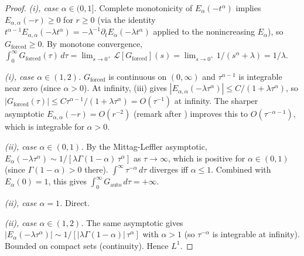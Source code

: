 \documentclass[11pt]{article}
\theoremstyle{definition}
\theoremstyle{remark}
\begin{document}
\begin{proof}
\emph{(i), case $\alpha \in (0, 1]$.}  Complete
monotonicity of $E_\alpha(-t^\alpha)$ implies
$E_{\alpha,\alpha}(-r) \geq 0$ for $r \geq 0$
(via the identity $t^{\alpha-1} E_{\alpha,\alpha}
(-\lambda t^\alpha) = -\lambda^{-1}\partial_t
E_\alpha(-\lambda t^\alpha)$ applied to the
nonincreasing $E_\alpha$), so
$G_{\mathrm{forced}} \geq 0$.  By monotone
convergence,
$\int_0^\infty G_{\mathrm{forced}}(\tau)\,d\tau
= \lim_{s \to 0^+} \mathcal{L}[G_{\mathrm{forced}}](s)
= \lim_{s \to 0^+} 1/(s^\alpha + \lambda)
= 1/\lambda$.

\emph{(i), case $\alpha \in (1, 2)$.}
$G_{\mathrm{forced}}$ is continuous on $(0, \infty)$
and $\tau^{\alpha-1}$ is integrable near zero
(since $\alpha > 0$).  At infinity,
(iii) gives
$|E_{\alpha,\alpha}(-\lambda \tau^\alpha)|
\leq C/(1 + \lambda \tau^\alpha)$, so
$|G_{\mathrm{forced}}(\tau)|
\leq C \tau^{\alpha-1}/(1 + \lambda \tau^\alpha)
= O(\tau^{-1})$ at infinity.  The sharper
asymptotic $E_{\alpha,\alpha}(-r) = O(r^{-2})$
(remark after ) improves this
to $O(\tau^{-\alpha-1})$, which is integrable for
$\alpha > 0$.

\emph{(ii), case $\alpha \in (0, 1)$.}  By the
Mittag-Leffler asymptotic,
$E_\alpha(-\lambda \tau^\alpha)
\sim 1/[\lambda\Gamma(1-\alpha)\,\tau^\alpha]$ as
$\tau \to \infty$, which is positive for $\alpha
\in (0, 1)$ (since $\Gamma(1-\alpha) > 0$ there).
$\int^\infty \tau^{-\alpha}\,d\tau$ diverges iff
$\alpha \leq 1$.  Combined with $E_\alpha(0) = 1$,
this gives $\int_0^\infty G_{\mathrm{auto}}\,d\tau
= +\infty$.

\emph{(ii), case $\alpha = 1$.}  Direct.

\emph{(ii), case $\alpha \in (1, 2)$.}  The same
asymptotic gives $|E_\alpha(-\lambda\tau^\alpha)|
\sim 1/[|\lambda\Gamma(1-\alpha)|\,\tau^\alpha]$ with
$\alpha > 1$ (so $\tau^{-\alpha}$ is integrable at
infinity).  Bounded on compact sets (continuity).
Hence $L^1$.
\end{proof}
\end{document}
